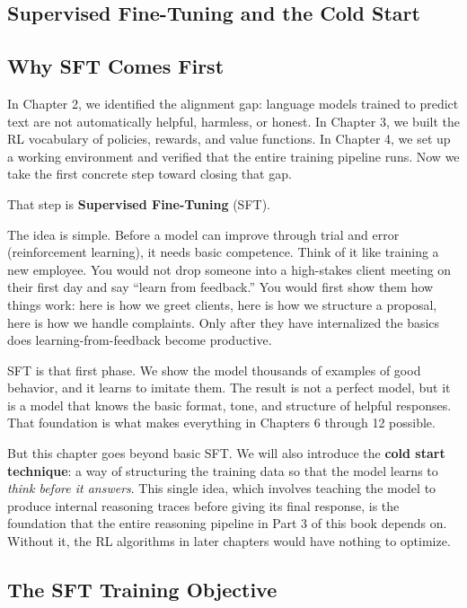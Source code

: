 \begin{chapterenv}

\chapter{Supervised Fine-Tuning and the Cold Start}

\section{Why SFT Comes First}

In Chapter 2, we identified the alignment gap: language models trained to predict text are not automatically helpful, harmless, or honest. In Chapter 3, we built the RL vocabulary of policies, rewards, and value functions. In Chapter 4, we set up a working environment and verified that the entire training pipeline runs. Now we take the first concrete step toward closing that gap.

That step is \textbf{Supervised Fine-Tuning} (SFT).

The idea is simple. Before a model can improve through trial and error (reinforcement learning), it needs basic competence. Think of it like training a new employee. You would not drop someone into a high-stakes client meeting on their first day and say ``learn from feedback.'' You would first show them how things work: here is how we greet clients, here is how we structure a proposal, here is how we handle complaints. Only after they have internalized the basics does learning-from-feedback become productive.

SFT is that first phase. We show the model thousands of examples of good behavior, and it learns to imitate them. The result is not a perfect model, but it is a model that knows the basic format, tone, and structure of helpful responses. That foundation is what makes everything in Chapters 6 through 12 possible.

But this chapter goes beyond basic SFT. We will also introduce the \textbf{cold start technique}: a way of structuring the training data so that the model learns to \textit{think before it answers}. This single idea, which involves teaching the model to produce internal reasoning traces before giving its final response, is the foundation that the entire reasoning pipeline in Part 3 of this book depends on. Without it, the RL algorithms in later chapters would have nothing to optimize.

\section{The SFT Training Objective}


\end{chapterenv}
